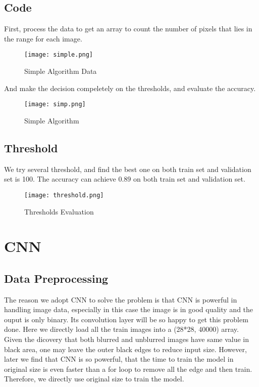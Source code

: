 \documentclass[conference]{IEEEtran}
\begin{document}
\subsection{Code}
First, process the data to get an array to count the number of pixels that lies in the range for each image.
\begin{figure}
    \centering
    \texttt{[image: simple.png]}
    \caption{Simple Algorithm Data}
    \label{fig9:Simple Algorithm Data}
    \end{figure}
And make the decision compeletely on the thresholds, and evaluate the accuracy.
\begin{figure}
    \centering
    \texttt{[image: simp.png]}
    \caption{Simple Algorithm}
    \label{fig10:Simple Algorithm}
    \end{figure}
\subsection{Threshold}
We try several threshold, and find the best one on both train set and validation set is 100.
The accuracy can achieve $0.89$ on both train set and validation set.
\begin{figure}
    \centering
    \texttt{[image: threshold.png]}
    \caption{Thresholds Evaluation}
    \label{fig11:Thresholds Evaluation}
    \end{figure}

\section{CNN}

\subsection{Data Preprocessing}
The reason we adopt CNN to solve the problem is that CNN is powerful in handling image data, especially in this case the image is 
in good quality and the ouput is only binary. Its convolution layer will be so happy to get this problem done.
Here we directly load all the train images into a (28*28, 40000) array. Given the dicovery that both blurred and unblurred images have
same value in black area, one may leave the outer black edges to reduce input size. However, later we find that CNN is so powerful, that 
the time to train the model in original size is even faster than a for loop to remove all the edge and then train. Therefore,
we directly use original size to train the model.
\end{document}
